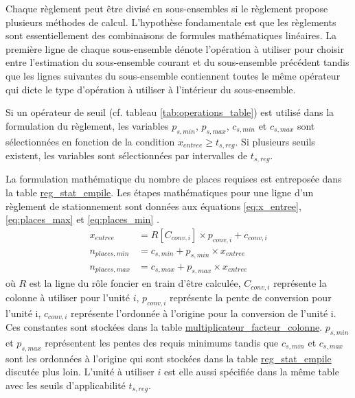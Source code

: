             Chaque règlement peut être divisé en sous-ensembles si le règlement propose plusieurs méthodes de calcul. L'hypothèse fondamentale est que les règlements sont essentiellement des combinaisons de formules mathématiques linéaires. La première ligne de chaque sous-ensemble dénote l'opération à utiliser pour choisir entre l'estimation du sous-ensemble courant et du sous-ensemble précédent tandis que les lignes suivantes du sous-ensemble contiennent toutes le même opérateur qui dicte le type d'opération à utiliser à l'intérieur du sous-ensemble.\par 
            Si un opérateur de seuil (cf. tableau \ref{tab:operations_table}) est utilisé dans la formulation du règlement, les variables $p_{s,min}$, $p_{s,max}$, $c_{s,min}$ et $c_{s,max}$ sont sélectionnées en fonction de la condition $x_{entree} \geq t_{s,reg}$. Si plusieurs seuils existent, les variables sont sélectionnées par intervalles de $t_{s,reg}$.\par
            La formulation mathématique du nombre de places requises est entreposée dans la table \underline{reg\_stat\_empile}. Les étapes mathématiques pour une ligne d'un règlement de stationnement sont données aux équations \ref{eq:x_entree}, \ref{eq:places_max} et \ref{eq:places_min}  .
            \begin{align}
                x_{entree} &= R[C_{conv,i}] \times p_{conv,i} + c_{conv,i} \label{eq:x_entree}\\
                n_{places,min} &= c_{s,min} + p_{s,min} \times x_{entree} \label{eq:places_min}\\
                n_{places,max} &=  c_{s,max} + p_{s,max} \times x_{entree} \label{eq:places_max}
            \end{align}
            où $R$ est la ligne du rôle foncier en train d'être calculée, $C_{conv,i}$ représente la colonne à utiliser pour l'unité $i$, $p_{conv,i}$ représente la pente de conversion pour l'unité i, $c_{conv,i} $ représente l'ordonnée à l'origine pour la conversion de l'unité i. Ces constantes sont stockées dans la table \ul{multiplicateur\_facteur\_colonne}. $p_{s,min}$ et $p_{s,max}$ représentent les pentes des requis minimums tandis que $c_{s,min}$ et $c_{s,max}$ sont les ordonnées à l'origine qui sont stockées dans la table \ul{reg\_stat\_empile} discutée plus loin. L'unité à utiliser $i$ est elle aussi spécifiée dans la même table avec les seuils d'applicabilité $t_{s,reg}$. \par
            
